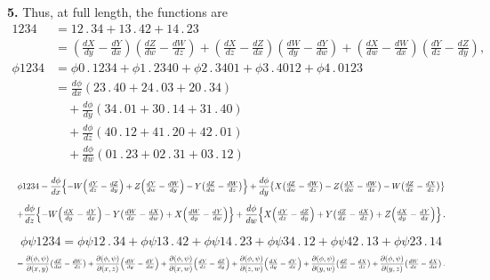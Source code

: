 \documentclass[11pt]{article}
\begin{document}
\medskip
\textbf{5.} Thus, at full length, the functions are
\begin{align*}
1234 &= 12\,.\,34 + 13\,.\,42 + 14\,.\,23\\
&= \left(\tfrac{dX}{dy} - \tfrac{dY}{dx}\right)\!\left(\tfrac{dZ}{dw} - \tfrac{dW}{dz}\right) + \left(\tfrac{dX}{dz} - \tfrac{dZ}{dx}\right)\!\left(\tfrac{dW}{dy} - \tfrac{dY}{dw}\right) + \left(\tfrac{dX}{dw} - \tfrac{dW}{dx}\right)\!\left(\tfrac{dY}{dz} - \tfrac{dZ}{dy}\right),\\[4pt]
\phi 1234 &= \phi 0\,.\,1234 + \phi 1\,.\,2340 + \phi 2\,.\,3401 + \phi 3\,.\,4012 + \phi 4\,.\,0123\\
&= \frac{d\phi}{dx}(23\,.\,40 + 24\,.\,03 + 20\,.\,34)\\
&\quad + \frac{d\phi}{dy}(34\,.\,01 + 30\,.\,14 + 31\,.\,40)\\
&\quad + \frac{d\phi}{dz}(40\,.\,12 + 41\,.\,20 + 42\,.\,01)\\
&\quad + \frac{d\phi}{dw}(01\,.\,23 + 02\,.\,31 + 03\,.\,12)
\end{align*}

\[
\resizebox{\textwidth}{!}{$\displaystyle
\phi 1234 = \frac{d\phi}{dx}\!\left\{-W\!\left(\tfrac{dY}{dz} - \tfrac{dZ}{dy}\right) + Z\!\left(\tfrac{dY}{dw} - \tfrac{dW}{dy}\right) - Y\!\left(\tfrac{dZ}{dw} - \tfrac{dW}{dz}\right)\right\}
+ \frac{d\phi}{dy}\!\left\{X\!\left(\tfrac{dZ}{dw} - \tfrac{dW}{dz}\right) - Z\!\left(\tfrac{dX}{dw} - \tfrac{dW}{dx}\right) - W\!\left(\tfrac{dZ}{dx} - \tfrac{dX}{dz}\right)\right\}
$}
\]
\[
\resizebox{\textwidth}{!}{$\displaystyle
+ \frac{d\phi}{dz}\!\left\{-W\!\left(\tfrac{dX}{dy} - \tfrac{dY}{dx}\right) - Y\!\left(\tfrac{dW}{dx} - \tfrac{dX}{dw}\right) + X\!\left(\tfrac{dW}{dy} - \tfrac{dY}{dw}\right)\right\}
+ \frac{d\phi}{dw}\!\left\{X\!\left(\tfrac{dY}{dz} - \tfrac{dZ}{dy}\right) + Y\!\left(\tfrac{dZ}{dx} - \tfrac{dX}{dz}\right) + Z\!\left(\tfrac{dX}{dy} - \tfrac{dY}{dx}\right)\right\}.
$}
\]

\[
\phi\psi 1234 = \phi\psi 12\,.\,34 + \phi\psi 13\,.\,42 + \phi\psi 14\,.\,23 + \phi\psi 34\,.\,12 + \phi\psi 42\,.\,13 + \phi\psi 23\,.\,14
\]
\[
\resizebox{\textwidth}{!}{$\displaystyle
= \frac{\partial(\phi,\psi)}{\partial(x,y)}\!\left(\tfrac{dZ}{dw} - \tfrac{dW}{dz}\right) + \frac{\partial(\phi,\psi)}{\partial(x,z)}\!\left(\tfrac{dW}{dy} - \tfrac{dY}{dw}\right) + \frac{\partial(\phi,\psi)}{\partial(x,w)}\!\left(\tfrac{dY}{dz} - \tfrac{dZ}{dy}\right)
+ \frac{\partial(\phi,\psi)}{\partial(z,w)}\!\left(\tfrac{dX}{dy} - \tfrac{dY}{dx}\right) + \frac{\partial(\phi,\psi)}{\partial(y,w)}\!\left(\tfrac{dZ}{dx} - \tfrac{dX}{dz}\right) + \frac{\partial(\phi,\psi)}{\partial(y,z)}\!\left(\tfrac{dW}{dx} - \tfrac{dX}{dw}\right).
$}
\]
\end{document}
